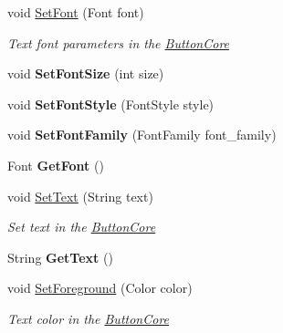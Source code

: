 \begin{DoxyCompactItemize}
void \mbox{\hyperlink{class_space_v_i_l_1_1_button_core_a7689c84be1b1b152a07186a32a08f273}{Set\+Font}} (Font font)
\begin{DoxyCompactList}\small\item\em Text font parameters in the \mbox{\hyperlink{class_space_v_i_l_1_1_button_core}{Button\+Core}} \end{DoxyCompactList}\item 
\mbox{\label{class_space_v_i_l_1_1_button_core_a9ad35157c53a54959d8ccd189c0f00c6}} 
void {\bfseries Set\+Font\+Size} (int size)
\item 
\mbox{\label{class_space_v_i_l_1_1_button_core_a3f5de633dc78925402ab2b24fbeb6a9b}} 
void {\bfseries Set\+Font\+Style} (Font\+Style style)
\item 
\mbox{\label{class_space_v_i_l_1_1_button_core_a581128f455f2d7a8b88d7060a670cf07}} 
void {\bfseries Set\+Font\+Family} (Font\+Family font\+\_\+family)
\item 
\mbox{\label{class_space_v_i_l_1_1_button_core_a72b81cdaceb15c8c7e70f623f88ac179}} 
Font {\bfseries Get\+Font} ()
\item 
void \mbox{\hyperlink{class_space_v_i_l_1_1_button_core_a86457a942d46d88f4df249da20fabda4}{Set\+Text}} (String text)
\begin{DoxyCompactList}\small\item\em Set text in the \mbox{\hyperlink{class_space_v_i_l_1_1_button_core}{Button\+Core}} \end{DoxyCompactList}\item 
\mbox{\label{class_space_v_i_l_1_1_button_core_a908f219a802c4ecd793cfe32183fb7f2}} 
String {\bfseries Get\+Text} ()
\item 
void \mbox{\hyperlink{class_space_v_i_l_1_1_button_core_aa9d1ad0d72fc521d412209dd15b5ed54}{Set\+Foreground}} (Color color)
\begin{DoxyCompactList}\small\item\em Text color in the \mbox{\hyperlink{class_space_v_i_l_1_1_button_core}{Button\+Core}} \end{DoxyCompactList}\item 
\mbox{\label{class_space_v_i_l_1_1_button_core_ae92f34995dab81d21aed730912315f86}} 

\end{DoxyCompactItemize}
